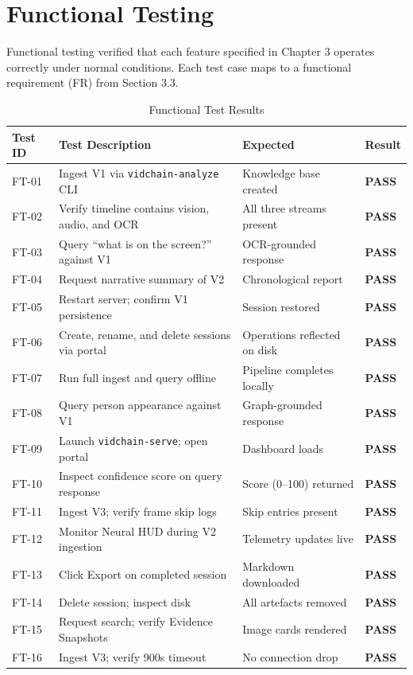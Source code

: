\section{Functional Testing}

Functional testing verified that each feature specified in Chapter 3 operates correctly under normal conditions. Each test case maps to a functional requirement (FR) from Section 3.3.

\begin{table}[H]
\centering
\small
\caption{Functional Test Results}
\label{tab:functional}
\begin{tabularx}{\textwidth}{|l|X|l|l|}
\hline
\rowcolor[HTML]{EFEFEF}
\textbf{Test ID} & \textbf{Test Description} & \textbf{Expected} & \textbf{Result} \\ \hline
FT-01 & Ingest V1 via \texttt{vidchain-analyze} CLI & Knowledge base created & \textbf{PASS} \\ \hline
FT-02 & Verify timeline contains vision, audio, and OCR & All three streams present & \textbf{PASS} \\ \hline
FT-03 & Query ``what is on the screen?'' against V1 & OCR-grounded response & \textbf{PASS} \\ \hline
FT-04 & Request narrative summary of V2 & Chronological report & \textbf{PASS} \\ \hline
FT-05 & Restart server; confirm V1 persistence & Session restored & \textbf{PASS} \\ \hline
FT-06 & Create, rename, and delete sessions via portal & Operations reflected on disk & \textbf{PASS} \\ \hline
FT-07 & Run full ingest and query offline & Pipeline completes locally & \textbf{PASS} \\ \hline
FT-08 & Query person appearance against V1 & Graph-grounded response & \textbf{PASS} \\ \hline
FT-09 & Launch \texttt{vidchain-serve}; open portal & Dashboard loads & \textbf{PASS} \\ \hline
FT-10 & Inspect confidence score on query response & Score (0--100) returned & \textbf{PASS} \\ \hline
FT-11 & Ingest V3; verify frame skip logs & Skip entries present & \textbf{PASS} \\ \hline
FT-12 & Monitor Neural HUD during V2 ingestion & Telemetry updates live & \textbf{PASS} \\ \hline
FT-13 & Click Export on completed session & Markdown downloaded & \textbf{PASS} \\ \hline
FT-14 & Delete session; inspect disk & All artefacts removed & \textbf{PASS} \\ \hline
FT-15 & Request search; verify Evidence Snapshots & Image cards rendered & \textbf{PASS} \\ \hline
FT-16 & Ingest V3; verify 900s timeout & No connection drop & \textbf{PASS} \\ \hline
\end{tabularx}
\end{table}

